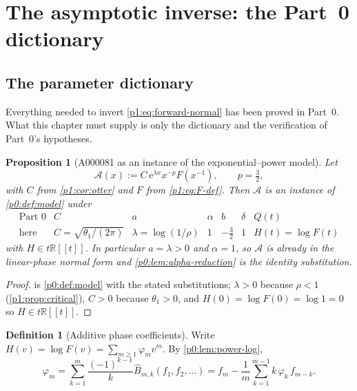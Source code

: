 \documentclass[11pt,a4paper,oneside]{book}
\theoremstyle{plain}
\newtheorem{proposition}[theorem]{Proposition}
\theoremstyle{definition}
\newtheorem{definition}[theorem]{Definition}
\theoremstyle{remark}
\newcommand{\Real}{\mathbb{R}}
\newcommand{\e}{\mathrm{e}}
\newcommand{\OB}{\widehat{B}}
\begin{document}
\section{The asymptotic inverse: the Part~0 dictionary}
\label{p1:sec:inverse}

\subsection{The parameter dictionary}

Everything needed to invert \cref{p1:eq:forward-normal} has been proved in Part~0.  What this
chapter must supply is only the dictionary and the verification of Part~0's hypotheses.

\begin{proposition}[A000081 as an instance of the exponential--power model]
\label{p1:prop:dictionary}
Let
\begin{equation}
 \mathcal A(x):=C\,\e^{\lambda x}x^{-p}F(x^{-1}),
 \qquad p=\tfrac32 ,
 \label{p1:eq:interpolant}
\end{equation}
with $C$ from \cref{p1:cor:otter} and $F$ from \cref{p1:eq:F-def}.  Then $\mathcal A$ is an
instance of \cref{p0:def:model} under
\begin{equation}
 \boxed{\;
 \begin{array}{c|cccccc}
  \text{Part 0} & C & a & \alpha & b & \delta & Q(t)\\\hline
  \text{here} & C=\sqrt{\theta_1/(2\pi)} & \lambda=\log(1/\rho) & 1
  & -\tfrac32 & 1 & H(t)=\log F(t)
 \end{array}\;}
 \label{p1:eq:dictionary}
\end{equation}
with $H\in t\Real[[t]]$.  In particular $a=\lambda>0$ and $\alpha=1$, so $\mathcal A$ is
already in the linear-phase normal form and \cref{p0:lem:alpha-reduction} is the identity
substitution.
\end{proposition}

\begin{proof}
 is \cref{p0:def:model} with the stated substitutions; $\lambda>0$
because $\rho<1$ (\cref{p1:prop:critical}), $C>0$ because $\theta_1>0$, and $H(0)=\log
F(0)=\log1=0$ so $H\in t\Real[[t]]$.
\end{proof}

\begin{definition}[Additive phase coefficients]
\label{p1:def:phi}
Write $H(v)=\log F(v)=\sum_{m\ge1}\varphi_mv^{m}$.  By \cref{p0:lem:power-log},
\begin{equation}
 \varphi_m=\sum_{k=1}^{m}\frac{(-1)^{k-1}}{k}\OB_{m,k}(f_1,f_2,\ldots)
 =f_m-\frac1m\sum_{k=1}^{m-1}k\,\varphi_k\,f_{m-k}.
 \label{p1:eq:phi}
\end{equation}
\end{definition}
\end{document}
